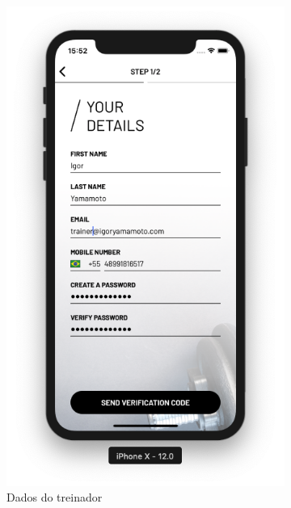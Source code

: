 \begin{figure}[H]
	\centering
    \begin{subfigure}[b]{0.4\textwidth}
        \includegraphics[width=\textwidth]{pfc/figuras/register-trainer.png}
        \caption{Dados do treinador}
        \label{fig:register-trainer-info}
    \end{subfigure}
    ~
	\begin{subfigure}[b]{0.4\textwidth}

\end{subfigure}
\end{figure}
